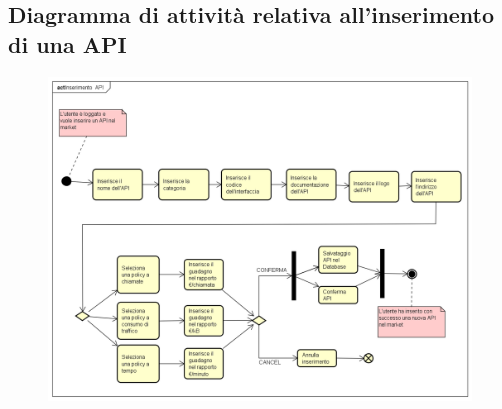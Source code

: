 \newpage
\subsection{Diagramma di attività relativa all'inserimento di una API}
\begin{figure}[h]
	\centering
	\includegraphics[width=1.0\linewidth]{IMG/Inserimento_API}
	\caption{}
	\label{fig:inserimentoapi}
\end{figure}


